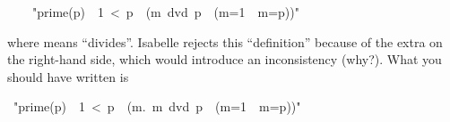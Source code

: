 \begin{isabelle}%
\isanewline
~~~~{"}prime(p)~{\isasymequiv}~1~<~p~{\isasymand}~(m~dvd~p~{\isasymlongrightarrow}~(m=1~{\isasymor}~m=p)){"}%
\begin{isamarkuptext}%
\noindent\small
where  means ``divides''.
Isabelle rejects this ``definition'' because of the extra  on the
right-hand side, which would introduce an inconsistency (why?). What you
should have written is%
\end{isamarkuptext}%
~{"}prime(p)~{\isasymequiv}~1~<~p~{\isasymand}~({\isasymforall}m.~m~dvd~p~{\isasymlongrightarrow}~(m=1~{\isasymor}~m=p)){"}\end{isabelle}%
